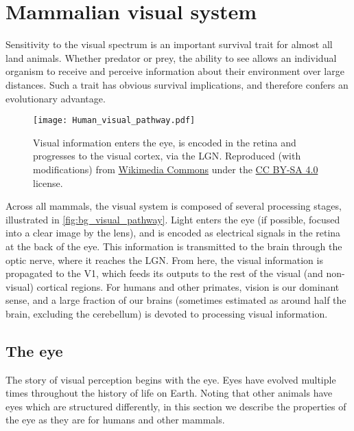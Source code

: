 \FloatBarrier
\section{Mammalian visual system}
\label{sec:bg_visual_system}

Sensitivity to the visual spectrum is an important survival trait for almost all land animals.
Whether predator or prey, the ability to see allows an individual organism to receive and perceive information about their environment over large distances.
Such a trait has obvious survival implications, and therefore confers an evolutionary advantage.

\begin{figure}[htbp]
\centering
\texttt{[image: Human\_visual\_pathway.pdf]}
\caption{%
Visual information enters the eye, is encoded in the retina and progresses to the visual cortex, via the \ac{LGN}.
Reproduced (with modifications) from \href{https://commons.wikimedia.org/wiki/File:Human_visual_pathway.svg}{Wikimedia Commons} under the \href{https://creativecommons.org/licenses/by-sa/4.0/deed.en}{CC BY-SA 4.0} license.
}
\label{fig:bg_visual_pathway}
\end{figure}

Across all mammals, the visual system is composed of several processing stages, illustrated in \autoref{fig:bg_visual_pathway}.
Light enters the eye (if possible, focused into a clear image by the lens), and is encoded as electrical signals in the retina at the back of the eye.
This information is transmitted to the brain through the optic nerve, where it reaches the \ac{LGN}.
From here, the visual information is propagated to the \acf{V1}, which feeds its outputs to the rest of the visual (and non-visual) cortical regions.
For humans and other primates, vision is our dominant sense, and a large fraction of our brains (sometimes estimated as around half the brain, excluding the cerebellum) is devoted to processing visual information.


\subsection{The eye}

The story of visual perception begins with the eye.
Eyes have evolved multiple times throughout the history of life on Earth.
Noting that other animals have eyes which are structured differently, in this section we describe the properties of the eye as they are for humans and other mammals.


